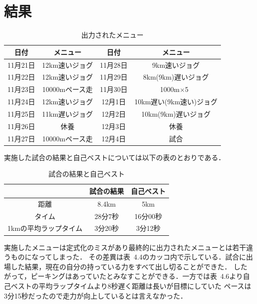 \documentclass[12pt,fleqn]{jreport}
\begin{document}
\section{結果}
\vspace{1cm}
\begin{longtable}{|c|c|c|c|}
  \caption{出力されたメニュー}                                   \\
  \hline
  日付     & メニュー       & 日付     & メニュー                \\
  \hline
  11月21日 & 12km速いジョグ & 11月28日 & 9km速いジョグ           \\
  \hline
  11月22日 & 12km速いジョグ & 11月29日 & 8km(9km)遅いジョグ      \\
  \hline
  11月23日 & 10000mペース走 & 11月30日 & 1000m$\times$5\         \\
  \hline
  11月24日 & 12km速いジョグ & 12月1日  & 10km遅い(9km速い)ジョグ \\
  \hline
  11月25日 & 11km遅いジョグ & 12月2日  & 10km(9km)遅いジョグ     \\
  \hline
  11月26日 & 休養           & 12月3日  & 休養                    \\
  \hline
  11月27日 & 10000mペース走 & 12月4日  & 試合                    \\
  \hline
\end{longtable}
実施した試合の結果と自己ベストについては以下の表のとおりである．
\begin{table}[H]
  \caption{試合の結果と自己ベスト}
  \begin{center}
    \begin{tabular}{|c|c|c|}
      \hline
                            & 試合の結果 & 自己ベスト \\
      \hline
      距離                  & 8.4km      & 5km        \\
      \hline
      タイム                & 28分7秒    & 16分00秒   \\
      \hline
      1kmの平均ラップタイム & 3分20秒    & 3分12秒    \\
      \hline
    \end{tabular}
  \end{center}
\end{table}
実施したメニューは定式化のミスがあり最終的に出力されたメニューとは若干違うものになってしまった．
その差異は表\ 4.4のカッコ内で示している．試合に出場した結果，現在の自分の持っている力をすべて出し切ることができた．
したがって，ピーキングはあっていたとみなすことができる．一方では表\ 4.6より自己ベストの平均ラップタイムより8秒遅く距離は長いが目標にしていた
ペースは3分15秒だったので走力が向上しているとは言えなかった．
\newpage
\end{document}
